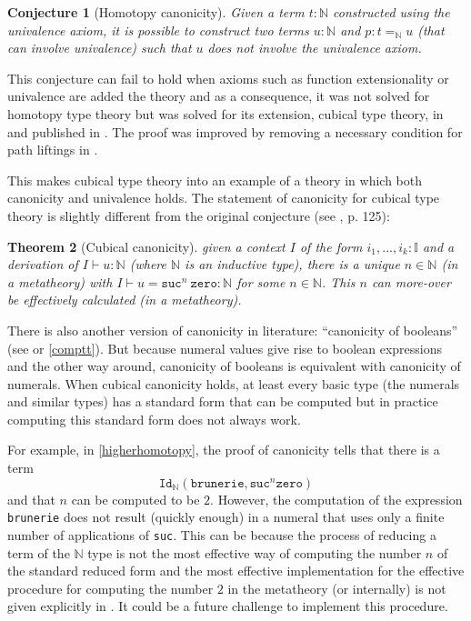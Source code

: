 \documentclass[12pt,a4paper,twoside,xetex]{book} %
\newtheorem{theorem}{Theorem}[section]
\newtheorem{conjecture}[theorem]{Conjecture}
\newcommand{\op}[1]{\mathtt{#1}}
\begin{document}
\begin{conjecture}[Homotopy canonicity]
Given a term $t: \mathbb{N}$ constructed using the univalence axiom, it is 
possible to 
construct two terms $u : \mathbb{N}$ and $p : t =_{\mathbb{N}} u$ (that can 
involve univalence) such that $u$ 
does not involve the univalence axiom.
\end{conjecture}

This conjecture can fail to hold when axioms such as function extensionality or 
univalence are added the theory and as a consequence, it was not solved for 
homotopy type theory but was solved for its extension, cubical type theory, in 
\cite{Huber2016} and published in \cite{Huber2017}. The proof was improved by 
removing a necessary condition for path liftings in
\cite{Coquand2019}.  

This makes cubical type theory into an example of a theory 
in which both canonicity and univalence holds. The statement of canonicity for 
cubical type theory is slightly different from the original conjecture (see 
\cite{Huber2016}, p. 125): 

\begin{theorem}[Cubical canonicity]\label{canonicity}
given a context $I$ of the form $i_1, ..., i_k : \mathbb{I}$ and a derivation 
of 
$I \vdash u : \mathbb{N}$ (where $\mathbb{N}$ is an inductive type), there is a 
unique $n \in \mathbb{N}$ (in a metatheory) with $I \vdash u = \op{suc}^n \  
\op{zero} : \mathbb{N}$ for some $n \in \mathbb{N}$. This $n$ can more-over be 
effectively calculated (in a metatheory). 
\end{theorem}

There is also another version of canonicity in literature: ``canonicity of booleans'' (see \cite{Angiuli2018} 
or \cref{comptt}). But 
because numeral values give rise to boolean expressions and the other way 
around, canonicity of booleans is equivalent with canonicity of numerals. When 
cubical canonicity holds, at least every basic type (the numerals and similar 
types) has a standard form that can be computed but in practice computing 
this standard form does not always work.

For example, in \cref{higherhomotopy}, 
the proof of canonicity tells that there is a term 
$$\texttt{Id}_{\mathbb{N}}(\texttt{brunerie}, \texttt{suc}^n 
\texttt{zero})$$ and that  $n$ can be computed to be $2$. However, the 
computation of the expression \texttt{brunerie} does not result (quickly 
enough) in a numeral that uses only a finite number of applications of 
\texttt{suc}. This can be because the process of reducing a term of the 
$\mathbb{N}$ type is not the most effective way of computing the number $n$ of 
the standard reduced form and the most effective implementation for the effective procedure for computing the 
number $2$ in the metatheory (or internally) is 
not given explicitly in \cite{Coquand2019}. It could be a future challenge to implement this procedure. 
\end{document}
